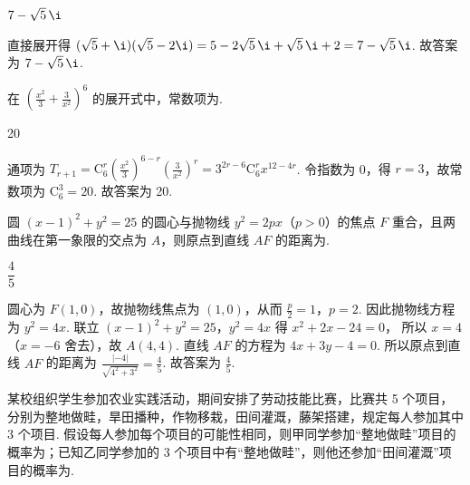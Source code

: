 \begin{answer}
\(7-\sqrt5\,\i\)
\end{answer}

\begin{solution}
直接展开得
\((\sqrt5+\i)(\sqrt5-2\i)=5-2\sqrt5\,\i+\sqrt5\,\i+2=7-\sqrt5\,\i\).
故答案为 \(7-\sqrt5\,\i\).
\end{solution}

\begin{problem}
在 \(\left(\frac{x^2}{3}+\frac{3}{x^2}\right)^6\) 的展开式中，常数项为\fillinblank{}.
\end{problem}

\begin{answer}
20
\end{answer}

\begin{solution}
通项为
\(T_{r+1} =\mathrm{C}_6^r\left(\frac{x^2}{3}\right)^{6-r}\left(\frac{3}{x^2}\right)^r =3^{2r-6}\mathrm{C}_6^r x^{12-4r}\).
令指数为 0，得 \(r=3\)，故常数项为
\(\mathrm{C}_6^3=20\).
故答案为 20.
\end{solution}

\begin{problem}
圆 \((x-1)^2+y^2=25\) 的圆心与抛物线 \(y^2=2px\)（\(p>0\)）的焦点 \(F\) 重合，且两曲线在第一象限的交点为 \(A\)，则原点到直线 \(AF\) 的距离为\fillinblank{}.
\end{problem}

\begin{answer}
\(\dfrac45\)
\end{answer}

\begin{solution}
圆心为 \(F(1,0)\)，故抛物线焦点为 \((1,0)\)，从而
\(\frac p2=1\)，\(p=2\).
因此抛物线方程为
\(y^2=4x\). 联立 \((x-1)^2+y^2=25\)，\(y^2=4x\) 得
\(x^2+2x-24=0\)，
所以
\(x=4\)
（\(x=-6\) 舍去），故
\(A(4,4)\). 直线 \(AF\) 的方程为
\(4x+3y-4=0\).
所以原点到直线 \(AF\) 的距离为
\(\frac{|{-4}|}{\sqrt{4^2+3^2}}=\frac45\). 故答案为 \(\frac45\).
\end{solution}

\begin{problem}
某校组织学生参加农业实践活动，期间安排了劳动技能比赛，比赛共 5 个项目，分别为整地做畦，旱田播种，作物移栽，田间灌溉，藤架搭建，规定每人参加其中 3 个项目. 假设每人参加每个项目的可能性相同，则甲同学参加“整地做畦”项目的概率为\fillinblank{}；已知乙同学参加的 3 个项目中有“整地做畦”，则他还参加“田间灌溉”项目的概率为\fillinblank{}.
\end{problem}

